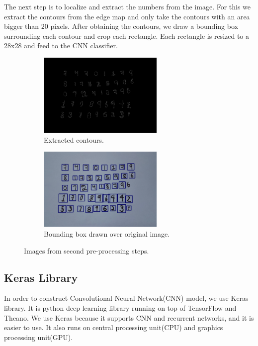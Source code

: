 \documentclass[12pt, letterpaper]{article}
\begin{document}
The next step is to localize and extract the numbers from the image. For this we extract the contours from the edge map and only take the contours with an area bigger than 20 pixels. After obtaining the contours, we draw a bounding box surrounding each contour and crop each rectangle. Each rectangle is resized to a 28x28 and feed to the CNN classifier.
\begin{figure}[!h]
\begin{center}
\begin{subfigure}{0.47\textwidth}
\centering
\includegraphics*[width=0.95 \textwidth, height=4cm]{count.png}
\caption{Extracted contours.}
\end{subfigure}
\begin{subfigure}{0.47\textwidth}
\centering
\includegraphics*[width=0.95 \textwidth, height=4cm]{bbox.png}
\caption{Bounding box drawn over original image.}
\end{subfigure}
\end{center}
\caption{Images from second pre-processing steps.}
\label{fig:first-pre}
\end{figure}


\subsection{Keras Library}

In order to construct Convolutional Neural Network(CNN) model, we use Keras library. It is python deep learning library running on top of TensorFlow and Theano. We use Keras because it supports CNN and recurrent networks, and it is easier to use. It also runs on central processing unit(CPU) and graphics processing unit(GPU)\cite{keras}. 
\end{document}
